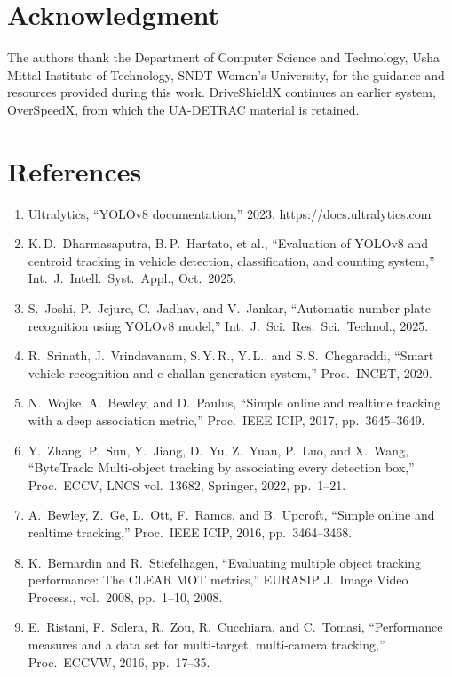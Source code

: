 \documentclass[10pt,a4paper,twocolumn]{article}
\begin{document}
\section*{Acknowledgment}
The authors thank the Department of Computer Science and Technology, Usha Mittal Institute of Technology, SNDT Women's
University, for the guidance and resources provided during this work. DriveShieldX continues an earlier system,
OverSpeedX, from which the UA-DETRAC material is retained.

\section*{References}
{\scriptsize
\begin{enumerate}[leftmargin=1.6em,label={\arabic*.},itemsep=0pt]
\item Ultralytics, ``YOLOv8 documentation,'' 2023. https://docs.ultralytics.com
\item K.\,D.\ Dharmasaputra, B.\,P.\ Hartato, et al., ``Evaluation of YOLOv8 and centroid tracking in vehicle detection, classification, and counting system,'' Int.\ J.\ Intell.\ Syst.\ Appl., Oct.\ 2025.
\item S.\ Joshi, P.\ Jejure, C.\ Jadhav, and V.\ Jankar, ``Automatic number plate recognition using YOLOv8 model,'' Int.\ J.\ Sci.\ Res.\ Sci.\ Technol., 2025.
\item R.\ Srinath, J.\ Vrindavanam, S.\,Y.\,R., Y.\,L., and S.\,S.\ Chegaraddi, ``Smart vehicle recognition and e-challan generation system,'' Proc.\ INCET, 2020.
\item N.\ Wojke, A.\ Bewley, and D.\ Paulus, ``Simple online and realtime tracking with a deep association metric,'' Proc.\ IEEE ICIP, 2017, pp.\ 3645--3649.
\item Y.\ Zhang, P.\ Sun, Y.\ Jiang, D.\ Yu, Z.\ Yuan, P.\ Luo, and X.\ Wang, ``ByteTrack: Multi-object tracking by associating every detection box,'' Proc.\ ECCV, LNCS vol.\ 13682, Springer, 2022, pp.\ 1--21.
\item A.\ Bewley, Z.\ Ge, L.\ Ott, F.\ Ramos, and B.\ Upcroft, ``Simple online and realtime tracking,'' Proc.\ IEEE ICIP, 2016, pp.\ 3464--3468.
\item K.\ Bernardin and R.\ Stiefelhagen, ``Evaluating multiple object tracking performance: The CLEAR MOT metrics,'' EURASIP J.\ Image Video Process., vol.\ 2008, pp.\ 1--10, 2008.
\item E.\ Ristani, F.\ Solera, R.\ Zou, R.\ Cucchiara, and C.\ Tomasi, ``Performance measures and a data set for multi-target, multi-camera tracking,'' Proc.\ ECCVW, 2016, pp.\ 17--35.

\end{enumerate}}
\end{document}
